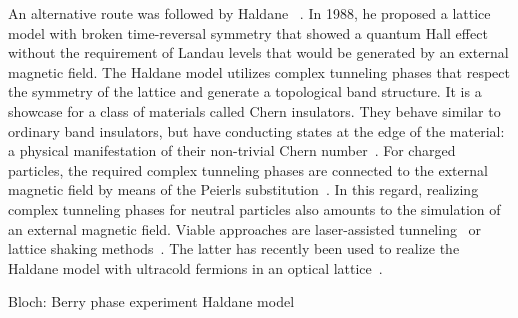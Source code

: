 An alternative route was followed by Haldane ~\cite{Haldane1988}.
In 1988, he proposed a lattice model with broken time-reversal symmetry that showed a quantum Hall effect without the requirement of Landau levels that would be generated by an external magnetic field.
The Haldane model utilizes complex tunneling phases that respect the symmetry of the lattice and generate a topological band structure.
It is a showcase for a class of materials called Chern insulators.
They behave similar to ordinary band insulators, but have conducting states at the edge of the material: a physical manifestation of their non-trivial Chern number~\cite{Hatsugai1993}.
For charged particles, the required complex tunneling phases are connected to the external magnetic field by means of the Peierls substitution~\cite{Peierls1933}.
In this regard, realizing complex tunneling phases for neutral particles also amounts to the simulation of an external magnetic field.
Viable approaches are laser-assisted tunneling~\cite{Aidelsburger2011,Aidelsburger2013,Miyake2013} or lattice shaking methods~\cite{Struck2012,Struck2013}.
The latter has recently been used to realize the Haldane model with ultracold fermions in an optical lattice~\cite{Jotzu2014}.

Bloch: Berry phase experiment
Haldane model \cite{Jotzu2014}



